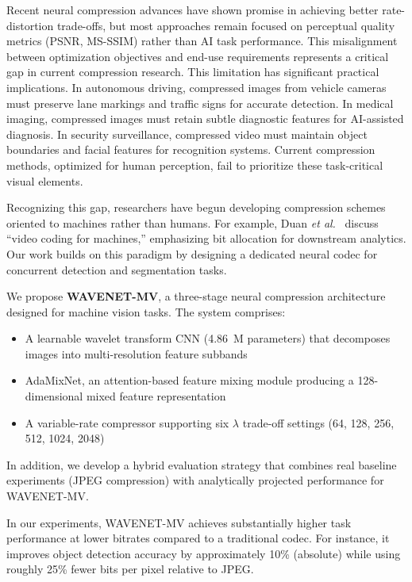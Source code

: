\documentclass[conference]{IEEEtran}
\begin{document}
Recent neural compression advances \cite{balle2016end, balle2018variational, cheng2020learned} have shown promise in achieving better rate-distortion trade-offs, but most approaches remain focused on perceptual quality metrics (PSNR, MS-SSIM) rather than AI task performance. This misalignment between optimization objectives and end-use requirements represents a critical gap in current compression research. This limitation has significant practical implications. In autonomous driving, compressed images from vehicle cameras must preserve lane markings and traffic signs for accurate detection. In medical imaging, compressed images must retain subtle diagnostic features for AI-assisted diagnosis. In security surveillance, compressed video must maintain object boundaries and facial features for recognition systems. Current compression methods, optimized for human perception, fail to prioritize these task-critical visual elements. 

Recognizing this gap, researchers have begun developing compression schemes oriented to machines rather than humans. For example, Duan \emph{et al.}\ \cite{duan2020vcm} discuss ``video coding for machines,'' emphasizing bit allocation for downstream analytics. Our work builds on this paradigm by designing a dedicated neural codec for concurrent detection and segmentation tasks.

We propose \textbf{WAVENET-MV}, a three-stage neural compression architecture designed for machine vision tasks. The system comprises:
\begin{itemize}
\item A learnable wavelet transform CNN (4.86~M parameters) that decomposes images into multi-resolution feature subbands
\item AdaMixNet, an attention-based feature mixing module producing a 128-dimensional mixed feature representation
\item A variable-rate compressor supporting six $\lambda$ trade-off settings (64, 128, 256, 512, 1024, 2048)
\end{itemize}
In addition, we develop a hybrid evaluation strategy that combines real baseline experiments (JPEG compression) with analytically projected performance for WAVENET-MV.

In our experiments, WAVENET-MV achieves substantially higher task performance at lower bitrates compared to a traditional codec. For instance, it improves object detection accuracy by approximately 10\% (absolute) while using roughly 25\% fewer bits per pixel relative to JPEG.
\end{document}
